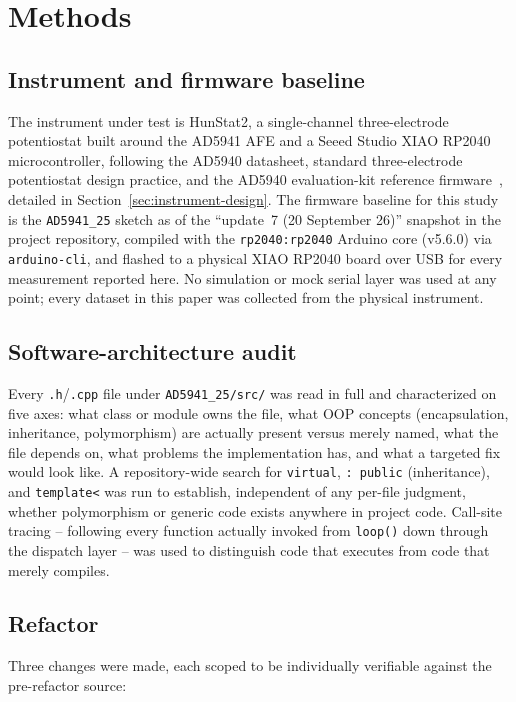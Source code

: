 \section{Methods}
\label{sec:methods}

\subsection{Instrument and firmware baseline}
The instrument under test is HunStat2, a single-channel three-electrode
potentiostat built around the AD5941 AFE and a Seeed Studio XIAO RP2040
microcontroller, following the AD5940 datasheet, standard three-electrode
potentiostat design practice, and the AD5940 evaluation-kit reference
firmware~\cite{devices2024ad5940,ad5940_eis_github}, detailed in
Section~\ref{sec:instrument-design}. The firmware baseline for this
study is the \texttt{AD5941\_25} sketch as of the ``update~7 (20 September
26)'' snapshot in the project repository, compiled with the
\texttt{rp2040:rp2040} Arduino core (v5.6.0) via \texttt{arduino-cli}, and
flashed to a physical XIAO RP2040 board over USB for every measurement
reported here. No simulation or mock serial layer was used at any point;
every dataset in this paper was collected from the physical instrument.

\subsection{Software-architecture audit}
Every \texttt{.h}/\texttt{.cpp} file under \texttt{AD5941\_25/src/} was read
in full and characterized on five axes: what class or module owns the file,
what OOP concepts (encapsulation, inheritance, polymorphism) are actually
present versus merely named, what the file depends on, what problems the
implementation has, and what a targeted fix would look like. A repository-wide
search for \texttt{virtual}, \texttt{: public} (inheritance), and
\texttt{template<} was run to establish, independent of any per-file
judgment, whether polymorphism or generic code exists anywhere in project
code. Call-site tracing -- following every function actually invoked from
\texttt{loop()} down through the dispatch layer -- was used to distinguish
code that executes from code that merely compiles.

\subsection{Refactor}
Three changes were made, each scoped to be individually verifiable against
the pre-refactor source:

